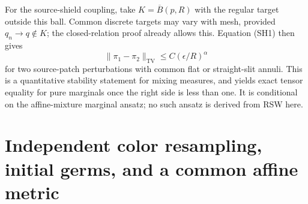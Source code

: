 \documentclass[11pt]{article}
\theoremstyle{definition}\newtheorem{definition}[theorem]{Definition}
\theoremstyle{remark}\newtheorem{remark}[theorem]{Remark}
\begin{document}
For the source-shield coupling, take $K=\overline B(p,R)$ with the
regular target outside this ball. Common discrete targets may vary with
mesh, provided $q_n\to q\notin K$; the closed-relation proof already allows
this. Equation (SH1) then gives
\[
 \|\pi_1-\pi_2\|_{\mathrm{TV}}
   \le C(\epsilon/R)^\alpha
 \tag{CB5}
\]
for two source-patch perturbations with common flat or straight-slit
annuli. This is a quantitative stability statement for mixing measures,
and yields exact tensor equality for pure marginals once the right side
is less than one. It is conditional on the affine-mixture marginal
ansatz; no such ansatz is derived from RSW here.

\section{Independent color resampling, initial germs, and a common affine metric}
\label{sec:affine-mixture-purity}
\end{document}
